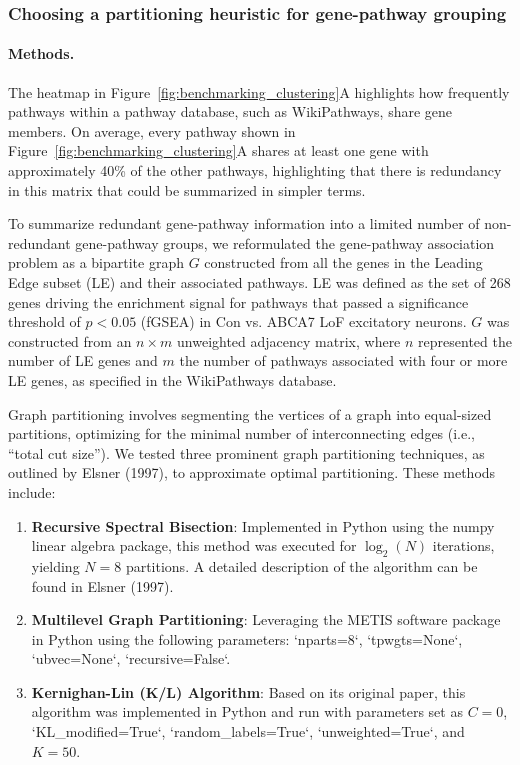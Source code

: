 \subsubsection{Choosing a partitioning heuristic for gene-pathway grouping}
\paragraph{Methods.}
The heatmap in Figure~\ref{fig:benchmarking_clustering}A highlights how frequently pathways within a pathway database, such as WikiPathways, share gene members. On average, every pathway shown in Figure~\ref{fig:benchmarking_clustering}A shares at least one gene with approximately 40\% of the other pathways, highlighting that there is redundancy in this matrix that could be summarized in simpler terms.

To summarize redundant gene-pathway information into a limited number of non-redundant gene-pathway groups, we reformulated the gene-pathway association problem as a bipartite graph $G$ constructed from all the genes in the Leading Edge subset (LE) and their associated pathways. LE was defined as the set of 268 genes driving the enrichment signal for pathways that passed a significance threshold of $p < 0.05$ (fGSEA) in Con vs. ABCA7 LoF excitatory neurons. $G$ was constructed from an $n \times m$ unweighted adjacency matrix, where $n$ represented the number of LE genes and $m$ the number of pathways associated with four or more LE genes, as specified in the WikiPathways database.

Graph partitioning involves segmenting the vertices of a graph into equal-sized partitions, optimizing for the minimal number of interconnecting edges (i.e., “total cut size”). We tested three prominent graph partitioning techniques, as outlined by Elsner (1997)\cite{Elsner1997-nt}, to approximate optimal partitioning. These methods include:

\begin{enumerate}
    \item \textbf{Recursive Spectral Bisection}: Implemented in Python using the numpy linear algebra package, this method was executed for $\log_2(N)$ iterations, yielding $N = 8$ partitions. A detailed description of the algorithm can be found in Elsner (1997)\cite{Elsner1997-nt}.
    \item \textbf{Multilevel Graph Partitioning}: Leveraging the METIS software package\cite{Karypis1997-it} in Python using the following parameters: `nparts=8`, `tpwgts=None`, `ubvec=None`, `recursive=False`.
    \item \textbf{Kernighan-Lin (K/L) Algorithm}: Based on its original paper\cite{Kernighan1970-rg}, this algorithm was implemented in Python and run with parameters set as $C=0$, `KL\_modified=True`, `random\_labels=True`, `unweighted=True`, and $K=50$.
\end{enumerate}

